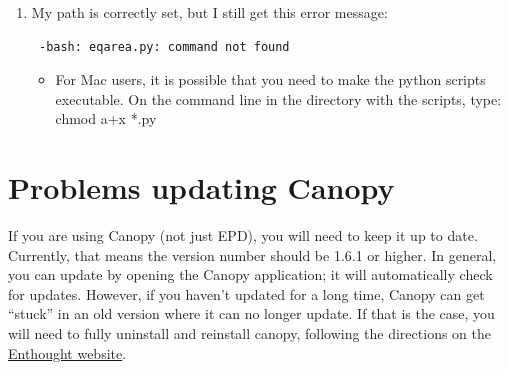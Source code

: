\documentclass[11pt]{book}
\begin{document}
{{{{\begin{enumerate}
\begin{itemize}
\item For Windows users:

\begin{verbatim} "eqarea.py" is not recognized as an internal or external command,
operable program or batch file.
\end{verbatim}

Setting your path should not be an issue in Windows if you are using the PmagPy prompt (created by the install script).  PmagPy functionality will be available only in the custom Command Prompt, so make sure you are using it.  However, if you do need to set your path for some reason, see:

\href{http://www.mathworks.com/matlabcentral/answers/94933-how-do-i-set-my-system-path-under-windows}{Setting your Path in Windows}

If you are using the \href{#full_pip}{pip install} instead of the PmagPy prompt, you'll need to use the command ``eqarea -h'', \textbf{not} ``eqarea.py -h''.  This is caused by a strange Windows quirk, but all you need to know is this: anytime the Cookbook gives a command, you'll need to drop the ``.py'' and all will be well.  

\end {itemize}

\item  My path is correctly set, but I still get this error message: \begin{verbatim} -bash: eqarea.py: command not found
\end{verbatim}

\begin{itemize}
\item  For Mac users, it is possible that you need to make the python scripts executable. On the command line in the directory with the scripts, type: chmod a+x *.py
\end{itemize}

\end{enumerate}

\section{Problems updating Canopy}
If you are using Canopy (not just EPD), you will need to keep it up to date.  Currently, that means the version number should be 1.6.1 or higher.  In general, you can update by opening the Canopy application; it will automatically check for updates.  However, if you haven't updated for a long time, Canopy can get ``stuck'' in an old version where it can no longer update.  If that is the case, you will need to fully uninstall and reinstall canopy, following the directions on the \href{https://support.enthought.com/hc/en-us/articles/204469570-Canopy-shows-no-updates-available-reinstalling-from-the-website}{Enthought website}.

}}}}
\end{document}
